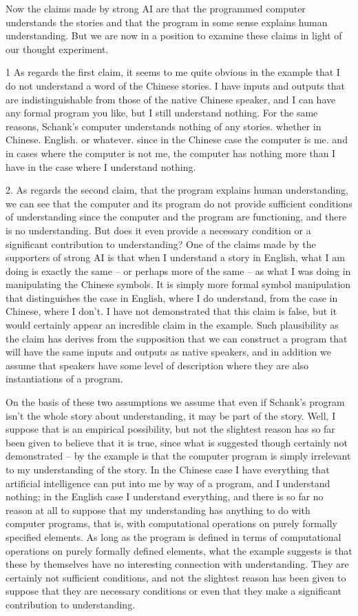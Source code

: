 Now the claims made by strong AI are that the programmed computer understands the stories and that the
program in some sense explains human understanding. But we are now in a position to examine these claims in
light of our thought experiment.

1 As regards the first claim, it seems to me quite obvious in the example that I do not understand a word of the
Chinese stories. I have inputs and outputs that are indistinguishable from those of the native Chinese speaker,
and I can have any formal program you like, but I still understand nothing. For the same reasons, Schank's
computer understands nothing of any stories. whether in Chinese. English. or whatever. since in the Chinese
case the computer is me. and in cases where the computer is not me, the computer has nothing more than I have in the case where I understand nothing.

2. As regards the second claim, that the program explains human understanding, we can see that the computer
and its program do not provide sufficient conditions of understanding since the computer and the program are
functioning, and there is no understanding. But does it even provide a necessary condition or a significant
contribution to understanding? One of the claims made by the supporters of strong AI is that when I understand
a story in English, what I am doing is exactly the same -- or perhaps more of the same -- as what I was doing in
manipulating the Chinese symbols. It is simply more formal symbol manipulation that distinguishes the case in
English, where I do understand, from the case in Chinese, where I don't. I have not demonstrated that this
claim is false, but it would certainly appear an incredible claim in the example. Such plausibility as the claim has
derives from the supposition that we can construct a program that will have the same inputs and outputs as
native speakers, and in addition we assume that speakers have some level of description where they are also
instantiations of a program.

On the basis of these two assumptions we assume that even if Schank's program isn't the whole story about
understanding, it may be part of the story. Well, I suppose that is an empirical possibility, but not the slightest
reason has so far been given to believe that it is true, since what is suggested though certainly not demonstrated
-- by the example is that the computer program is simply irrelevant to my understanding of the story. In the
Chinese case I have everything that artificial intelligence can put into me by way of a program, and I understand
nothing; in the English case I understand everything, and there is so far no reason at all to suppose that my
understanding has anything to do with computer programs, that is, with computational operations on purely
formally specified elements. As long as the program is defined in terms of computational operations on purely
formally defined elements, what the example suggests is that these by themselves have no interesting connection
with understanding. They are certainly not sufficient conditions, and not the slightest reason has been given to
suppose that they are necessary conditions or even that they make a significant contribution to understanding.

